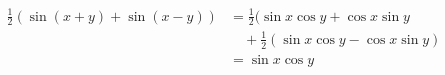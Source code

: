 \documentclass[nofonts]{ctexart}
\begin{document}
\begin{equation}
	\begin{split}
		\frac{1}{2}(\sin(x+y)+\sin(x-y))
		 &= \frac{1}{2}(\sin x \cos y + \cos x \sin y		\\
		 &\quad + \frac{1}{2}(\sin x \cos y - \cos x \sin y)	\\
		 &= \sin x \cos y
	\end{split}
\end{equation}
\end{document}
